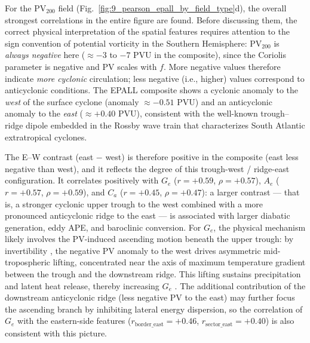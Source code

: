 
For the $\mathrm{PV}_{200}$ field
(Fig.~\ref{fig:9_pearson_epall_by_field_type}d), the overall strongest correlations in
the entire figure are found. Before discussing them, the correct physical interpretation
of the spatial features requires attention to the sign convention of potential vorticity
in the Southern Hemisphere: $\mathrm{PV}_{200}$ is \emph{always negative} here
($\approx -3$ to $-7$ PVU in the composite), since the Coriolis parameter is negative
and PV scales with $f$. More negative values therefore indicate \emph{more cyclonic}
circulation; less negative (i.e., higher) values correspond to anticyclonic conditions.
The EPALL composite shows a cyclonic anomaly to the \emph{west} of the surface cyclone
(anomaly $\approx -0.51$ PVU) and an anticyclonic anomaly to the \emph{east}
($\approx +0.40$ PVU), consistent with the well-known trough–ridge dipole embedded in
the Rossby wave train that characterizes South Atlantic extratropical cyclones.

The E–W contrast (east $-$ west) is therefore positive in the composite (east less
negative than west), and it reflects the degree of this trough-west / ridge-east
configuration. It correlates positively with $G_e$ ($r = +0.59$, $\rho = +0.57$),
$A_e$ ($r = +0.57$, $\rho = +0.59$), and $C_a$ ($r = +0.45$, $\rho = +0.47$): a
larger contrast — that is, a stronger cyclonic upper trough to the west combined with a
more pronounced anticyclonic ridge to the east — is associated with larger diabatic
generation, eddy APE, and baroclinic conversion. For $G_e$, the physical mechanism
likely involves the PV-induced ascending motion beneath the upper trough: by
invertibility \citep{hoskins1985use}, the negative PV anomaly to the west drives
asymmetric mid-tropospheric lifting, concentrated near the axis of maximum temperature
gradient between the trough and the downstream ridge. This lifting sustains
precipitation and latent heat release, thereby increasing $G_e$
\citep{attinger2021systematic}. The additional contribution of the downstream
anticyclonic ridge (less negative PV to the east) may further focus the ascending
branch by inhibiting lateral energy dispersion, so the correlation of $G_e$ with the
eastern-side features ($r_{\mathrm{border\_east}} = +0.46$, $r_{\mathrm{sector\_east}}
= +0.40$) is also consistent with this picture.

